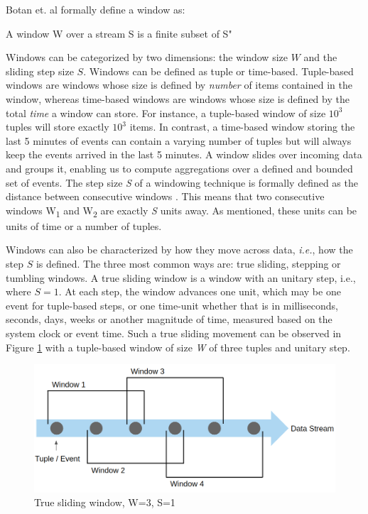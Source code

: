 Botan et. al \cite{Botan-SECRET} formally define a window as:

\begin{definition}
A window W over a stream S is a finite subset of S"
\end{definition}

Windows can be categorized by two dimensions: the window size $W$ and the sliding step size $S$. Windows can be defined as tuple or time-based. Tuple-based windows are windows whose size is defined by \emph{number} of items contained in the window, whereas time-based windows are windows whose size is defined by the total \emph{time} a window can store. For instance, a tuple-based window of size $10^3$ tuples will store exactly $10^3$ items. In contrast, a time-based window storing the last 5 minutes of events can contain a varying number of tuples but will always keep the events arrived in the last 5 minutes. A window slides over incoming data and groups it, enabling us to compute aggregations over a defined and bounded set of events. The step size \textit{S} of a windowing technique is formally defined as the distance between consecutive windows \cite{Botan-SECRET}. This means that two consecutive windows W\textsubscript{1} and W\textsubscript{2} are exactly \textit{S} units away. As mentioned, these units can be units of time or a number of tuples.

Windows can also be characterized by how they move across data, \textit{i.e.}, how the step $S$ is defined. The three most common ways are: true sliding, stepping or tumbling windows. A true sliding window is a window with an unitary step, i.e., where $S = 1$. At each step, the window advances one unit, which may be one event for tuple-based steps, or one time-unit whether that is in milliseconds, seconds, days, weeks or another magnitude of time, measured based on the system clock or event time. Such a true sliding movement can be observed in Figure \ref{fig:sliding-window} with a tuple-based window of size \textit{W} of three tuples and unitary step. 

\begin{figure}[!htb]
    \begin{center}
      \hspace*{0.6in}
      \includegraphics[scale=0.35]{figures/sliding.png}
      \caption[True sliding window]{True sliding window, W=3, S=1}
      \label{fig:sliding-window} 
    \end{center}
\end{figure} 

